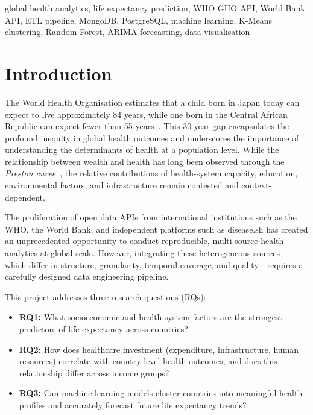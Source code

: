 \documentclass[conference]{IEEEtran}
\begin{document}
\begin{IEEEkeywords}
global health analytics, life expectancy prediction, WHO GHO API, World Bank
API, ETL pipeline, MongoDB, PostgreSQL, machine learning, K-Means clustering,
Random Forest, ARIMA forecasting, data visualisation
\end{IEEEkeywords}

\section{Introduction}

The World Health Organisation estimates that a child born in Japan today can
expect to live approximately 84 years, while one born in the Central African
Republic can expect fewer than 55 years~\cite{who2023}. This 30-year gap
encapsulates the profound inequity in global health outcomes and underscores
the importance of understanding the determinants of health at a population
level. While the relationship between wealth and health has long been observed
through the \emph{Preston curve}~\cite{preston1975}, the relative contributions
of health-system capacity, education, environmental factors, and
infrastructure remain contested and context-dependent.

The proliferation of open data APIs from international institutions such as the
WHO, the World Bank, and independent platforms such as disease.sh has created an
unprecedented opportunity to conduct reproducible, multi-source health analytics
at global scale. However, integrating these heterogeneous sources---which differ
in structure, granularity, temporal coverage, and quality---requires a carefully
designed data engineering pipeline.

This project addresses three research questions (RQs):

\begin{itemize}
  \item \textbf{RQ1:} What socioeconomic and health-system factors are the
    strongest predictors of life expectancy across countries?
  \item \textbf{RQ2:} How does healthcare investment (expenditure,
    infrastructure, human resources) correlate with country-level health
    outcomes, and does this relationship differ across income groups?
  \item \textbf{RQ3:} Can machine learning models cluster countries into
    meaningful health profiles and accurately forecast future life expectancy
    trends?
\end{itemize}
\end{document}
